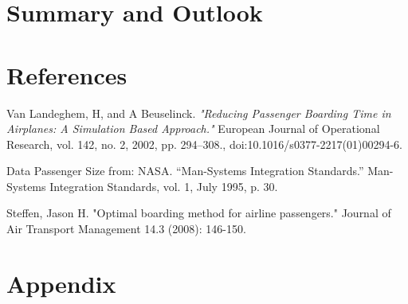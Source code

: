 \documentclass[11pt]{article}
\begin{document}
	

\section{Summary and Outlook}

\section{References}
\begin{thebibliography}{9}
	Van Landeghem, H, and A Beuselinck. 
	\textit{"Reducing Passenger Boarding Time in Airplanes: A Simulation Based Approach."} 
	European Journal of Operational Research, vol. 142, no. 2, 2002, pp. 294–308.,
	doi:10.1016/s0377-2217(01)00294-6.
	
	Data Passenger Size from:  NASA. “Man-Systems Integration Standards.” Man-Systems Integration Standards, vol. 1, July 1995, p. 30.
	
	Steffen, Jason H. "Optimal boarding method for airline passengers." Journal of Air Transport Management 14.3 (2008): 146-150.
\end{thebibliography}




\section{Appendix}
\end{document}
